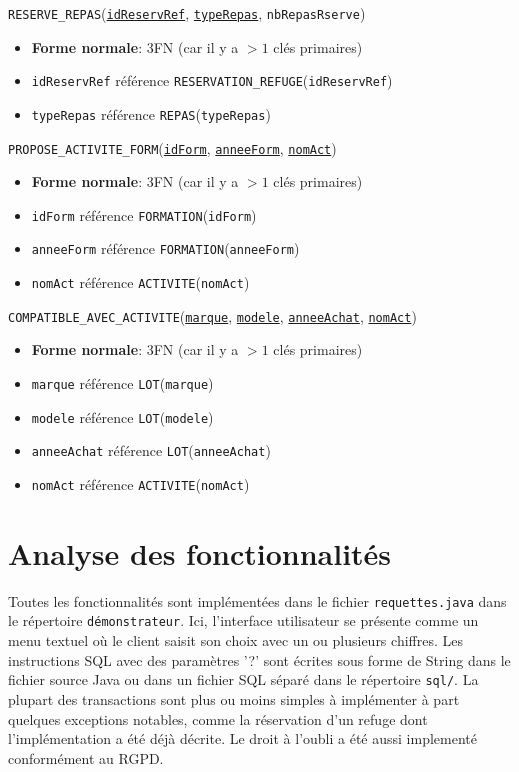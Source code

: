 \documentclass[12pt, a4paper]{article}
\newcommand\att[1]{\textnhtt{#1}}
\begin{document}
\att{RESERVE\_REPAS}(\att{\underline{idReservRef}}, \att{\underline{typeRepas}}, \att{nbRepasRserve})
\begin{itemize}
\item \textbf{Forme normale}: 3FN (car il y a $>1$ clés primaires)
\item \att{idReservRef} référence \att{RESERVATION\_REFUGE}(\att{idReservRef})
\item \att{typeRepas} référence \att{REPAS}(\att{typeRepas})
\end{itemize}

\att{PROPOSE\_ACTIVITE\_FORM}(\att{\underline{idForm}}, \att{\underline{anneeForm}}, \att{\underline{nomAct}})
\begin{itemize}
\item \textbf{Forme normale}: 3FN (car il y a $>1$ clés primaires)
\item \att{idForm} référence \att{FORMATION}(\att{idForm})
\item \att{anneeForm} référence \att{FORMATION}(\att{anneeForm})
\item \att{nomAct} référence \att{ACTIVITE}(\att{nomAct})
\end{itemize}

\att{COMPATIBLE\_AVEC\_ACTIVITE}(\att{\underline{marque}}, \att{\underline{modele}}, \att{\underline{anneeAchat}}, \att{\underline{nomAct}})
\begin{itemize}
\item \textbf{Forme normale}: 3FN (car il y a $>1$ clés primaires)
\item \att{marque} référence \att{LOT}(\att{marque})
\item \att{modele} référence \att{LOT}(\att{modele})
\item \att{anneeAchat} référence \att{LOT}(\att{anneeAchat})
\item \att{nomAct} référence \att{ACTIVITE}(\att{nomAct})
\end{itemize}


\section{Analyse des fonctionnalités}
Toutes les fonctionnalités sont implémentées dans le fichier \texttt{requettes.java} dans le répertoire \texttt{démonstrateur}.
Ici, l'interface utilisateur se présente comme un menu textuel où le client saisit son choix avec un ou plusieurs chiffres.
Les instructions SQL avec des paramètres '?' sont écrites sous forme de String dans le fichier source Java ou dans un fichier SQL séparé dans le répertoire \texttt{sql/}.
La plupart des transactions sont plus ou moins simples à implémenter à part quelques exceptions notables, comme la réservation d'un refuge dont l'implémentation a été déjà décrite.
Le droit à l'oubli a été aussi implementé conformément au RGPD.\@
\end{document}
